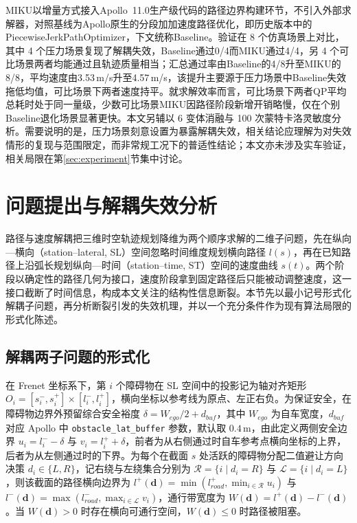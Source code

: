 \documentclass[a4paper,zihao=5]{ctexart}
\theoremstyle{definition}
\begin{document}
MIKU以增量方式接入Apollo~11.0生产级代码的路径边界构建环节，不引入外部求解器，对照基线为Apollo原生的分段加加速度路径优化，即历史版本中的PiecewiseJerkPathOptimizer，下文统称Baseline。验证在 8 个仿真场景上对比，其中 4 个压力场景复现了解耦失效，Baseline通过0/4而MIKU通过4/4，另 4 个可比场景两者均能通过且轨迹质量相当；汇总通过率由Baseline的4/8升至MIKU的8/8，平均速度由3.53\,m/s升至4.57\,m/s，该提升主要源于压力场景中Baseline失效拖低均值，可比场景下两者速度持平。就求解效率而言，可比场景下两者QP平均总耗时处于同一量级，少数可比场景MIKU因路径阶段新增开销略慢，仅在个别Baseline退化场景显著更快。本文另辅以 6 变体消融与 100 次蒙特卡洛灵敏度分析。需要说明的是，压力场景刻意设置为暴露解耦失效，相关结论应理解为对失效情形的复现与范围限定，而非常规工况下的普适性结论；本文亦未涉及实车验证，相关局限在第\ref{sec:experiment}节集中讨论。

\section{问题提出与解耦失效分析}
\label{sec:problem}

路径与速度解耦把三维时空轨迹规划降维为两个顺序求解的二维子问题，先在纵向—横向（station--lateral, SL）空间忽略时间维度规划横向路径 $l(s)$，再在已知路径上沿弧长规划纵向—时间（station--time, ST）空间的速度曲线 $s(t)$。两个阶段以确定性的路径几何为接口，速度阶段拿到固定路径后只能被动调整速度，这一接口截断了时间信息，构成本文关注的结构性信息断裂。本节先以最小记号形式化解耦子问题，再分析断裂引发的失效机理，并以一个充分条件作为现有算法局限的形式化陈述。

\subsection{解耦两子问题的形式化}
\label{subsec:decouple_formalize}

在 Frenet 坐标系下，第 $i$ 个障碍物在 SL 空间中的投影记为轴对齐矩形 $O_i = [s_i^{-}, s_i^{+}] \times [l_i^{-}, l_i^{+}]$，横向坐标以参考线为原点、左正右负。为保证安全，在障碍物边界外预留综合安全裕度 $\delta = W_{ego}/2 + d_{buf}$，其中 $W_{ego}$ 为自车宽度，$d_{buf}$ 对应 Apollo 中 \texttt{obstacle\_lat\_buffer} 参数，默认取 $0.4\,\mathrm{m}$，由此定义两侧安全边界 $u_i = l_i^{-} - \delta$ 与 $v_i = l_i^{+} + \delta$，前者为从右侧通过时自车参考点横向坐标的上界，后者为从左侧通过时的下界。为每个在截面 $s$ 处活跃的障碍物分配二值避让方向决策 $d_i \in \{L, R\}$，记右绕与左绕集合分别为 $\mathcal{R} = \{i \mid d_i = R\}$ 与 $\mathcal{L} = \{i \mid d_i = L\}$，则该截面的路径横向边界为 $l^{+}(\mathbf{d}) = \min(l_{road}^{+}, \min_{i \in \mathcal{R}} u_i)$ 与 $l^{-}(\mathbf{d}) = \max(l_{road}^{-}, \max_{i \in \mathcal{L}} v_i)$，通行带宽度为 $W(\mathbf{d}) = l^{+}(\mathbf{d}) - l^{-}(\mathbf{d})$。当 $W(\mathbf{d}) > 0$ 时存在横向可通行空间，$W(\mathbf{d}) \le 0$ 时路径被阻塞。
\end{document}
